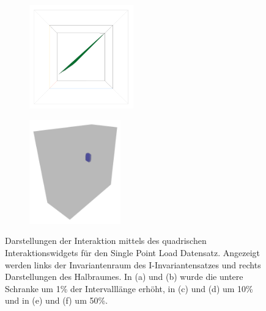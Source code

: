 \documentclass[a4paper,fontsize=12pt,toc=bib,halfparskip]{scrartcl}
\begin{document}
\begin{figure}
\begin{subfigure}{0.49\textwidth}
		\subcaption{}
		\label{SinglePointObject2}
	\end{subfigure}
	\medskip
	\begin{subfigure}{0.49\textwidth}
		\centering
		\includegraphics[height=4.5cm]{pictures/results/SinglePoint/SinglePoint_InvariantSpace3.png}
		\subcaption{}
		\label{SinglePointInvariant3}
	\end{subfigure}
	\hspace*{\fill}
	\begin{subfigure}{0.49\textwidth}
		\centering
		\includegraphics[height=4.5cm]{pictures/results/SinglePoint/SinglePoint_Object3.png}
		\subcaption{}
		\label{SinglePointObject3}
	\end{subfigure}
	\caption{Darstellungen der Interaktion mittels des quadrischen Interaktionswidgets f\"ur den Single Point Load Datensatz. Angezeigt werden links der Invariantenraum des I-Invariantensatzes und rechts Darstellungen des Halbraumes. In (a) und (b) wurde die untere Schranke um 1\% der Intervalll\"ange erh\"oht, in (c) und (d) um 10\% und in (e) und (f) um 50\%.}
	\label{SinglePointInteraction}
\end{figure}

\clearpage
\end{document}
